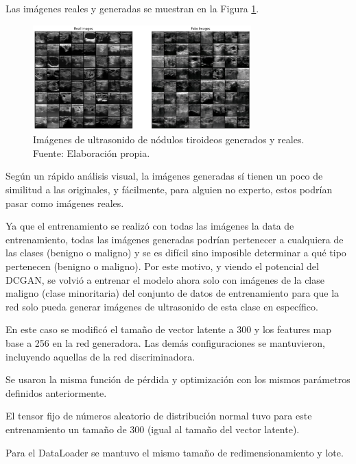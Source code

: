 Las imágenes reales y generadas se muestran en la Figura \ref{4:fig115}.

\begin{figure}[H]
	\begin{center}
		\includegraphics[width=0.75\textwidth]{4/figures/generated_real_1.png}
		\caption[Imágenes de ultrasonido de nódulos tiroideos generados y reales]{Imágenes de ultrasonido de nódulos tiroideos generados y reales. \\
		Fuente: Elaboración propia.}
		\label{4:fig115}
	\end{center}
\end{figure}

Según un rápido análisis visual, la imágenes generadas sí tienen un poco de similitud a las originales, y fácilmente, para alguien no experto, estos podrían pasar como imágenes reales.

Ya que el entrenamiento se realizó con todas las imágenes la data de entrenamiento, todas las imágenes generadas podrían pertenecer a cualquiera de las clases (benigno o maligno) y se es difícil sino imposible determinar a qué tipo pertenecen (benigno o maligno). Por este motivo, y viendo el potencial del DCGAN, se volvió a entrenar el modelo ahora solo con imágenes de la clase maligno (clase minoritaria) del conjunto de datos de entrenamiento para que la red solo pueda generar imágenes de ultrasonido de esta clase en específico.

En este caso se modificó el tamaño de vector latente a 300 y los features map base a 256 en la red generadora. Las demás configuraciones se mantuvieron, incluyendo aquellas de la red discriminadora.

Se usaron la misma función de pérdida y optimización con los mismos parámetros definidos anteriormente.

El tensor fijo de números aleatorio de distribución normal tuvo para este entrenamiento un tamaño de 300 (igual al tamaño del vector latente).

Para el DataLoader se mantuvo el mismo tamaño de redimensionamiento y lote.

